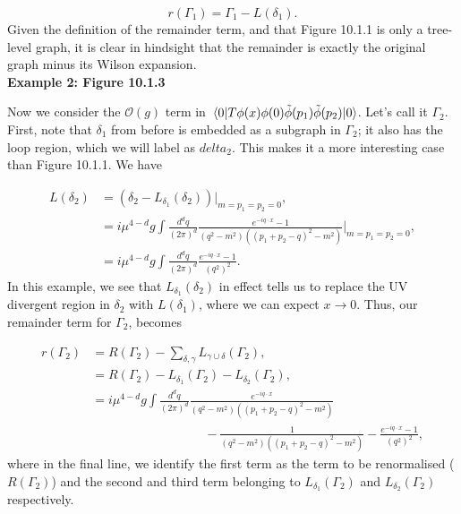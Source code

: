 \documentclass{scrartcl}
\begin{document}
\begin{equation}
    r(\Gamma_1) = \Gamma_1 - L(\delta_1).
\end{equation}
Given the definition of the remainder term, and that Figure 10.1.1 is only a tree-level graph, it is clear in hindsight that the remainder is exactly the original graph minus its Wilson expansion.\\

\noindent\textbf{Example 2: Figure 10.1.3}

Now we consider the $\mathcal{O}(g)$ term in $\mel{0}{T\phi(x)\phi(0)\Tilde{\phi}(p_1)\Tilde{\phi}(p_2)}{0}$. Let's call it $\Gamma_2$. First, note that $\delta_1$ from before is embedded as a subgraph in $\Gamma_2$; it also has the loop region, which we will label as $delta_2$. This makes it a more interesting case than Figure 10.1.1. We have

\begin{equation}
    \begin{split}
        L(\delta_2) &= (\delta_2 - L_{\delta_1}(\delta_2))\vert_{m=p_1=p_2=0},\\
        &=i\mu^{4-d}g \int \frac{d^dq}{(2\pi)^d} \frac{e^{-iq\cdot x}-1}{(q^2-m^2)((p_1+p_2-q)^2-m^2)}\bigg\vert_{m=p_1=p_2=0},\\
        &=i\mu^{4-d}g \int \frac{d^dq}{(2\pi)^d} \frac{e^{-iq\cdot x}-1}{(q^2)^2}.
    \end{split}
\end{equation}
In this example, we see that $L_{\delta_1}(\delta_2)$ in effect tells us to replace the UV divergent region in $\delta_2$ with $L(\delta_1)$, where we can expect $x\rightarrow 0$. Thus, our remainder term for $\Gamma_2$, becomes

\begin{equation}
    \begin{split}
        r(\Gamma_2) &= R(\Gamma_2) - \sum_{\delta,\gamma} L_{\gamma \cup \delta}(\Gamma_2),\\
        &= R(\Gamma_2) - L_{\delta_1}(\Gamma_2) - L_{\delta_2}(\Gamma_2),\\
        &=i\mu^{4-d}g \int \frac{d^dq}{(2\pi)^d} \frac{e^{-iq\cdot x}}{(q^2-m^2)((p_1+p_2-q)^2-m^2)} \\
        &\quad\quad\quad\quad\quad\quad\quad\quad\quad - \frac{1}{(q^2-m^2)((p_1+p_2-q)^2-m^2)} - \frac{e^{-iq\cdot x}-1}{(q^2)^2},
    \end{split}
\end{equation}
where in the final line, we identify the first term as the term to be renormalised ($R(\Gamma_2)$) and the second and  third term belonging to $L_{\delta_1}(\Gamma_2)$ and $L_{\delta_2}(\Gamma_2)$ respectively. 
\end{document}
